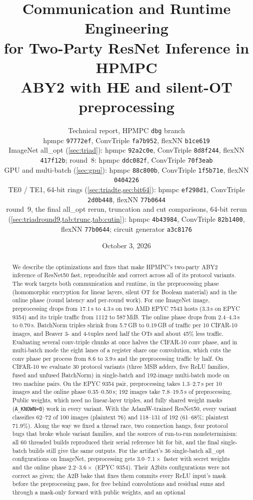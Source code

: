 \documentclass[10pt,a4paper]{article}
\title{Communication and Runtime Engineering\\for Two-Party ResNet Inference in HPMPC\\[4pt]
\large ABY2 with HE and silent-OT preprocessing}
\author{Technical report, HPMPC \texttt{dbg} branch\\[2pt]
\small hpmpc \texttt{97772ef}, ConvTriple \texttt{fa7b952}, flexNN \texttt{b1ce619}\\
ImageNet all\_opt (\cref{sec:triad}): hpmpc \texttt{92a2c0e}, ConvTriple \texttt{8d8f244}, flexNN \texttt{417f12b};
round~8: hpmpc \texttt{ddc082f}, ConvTriple \texttt{70f3eab}\\
GPU and multi-batch (\cref{sec:gpu}): hpmpc \texttt{88c800b}, ConvTriple \texttt{1f5b71e}, flexNN \texttt{0404226}\\
TE0 / TE1, 64-bit rings (\cref{sec:triadte,sec:bit64}): hpmpc \texttt{ef298d1}, ConvTriple \texttt{2d0b448}, flexNN
\texttt{77b0644}\\
round~9, the final all\_opt rerun, truncation and cut comparisons, 64-bit rerun (\cref{sec:triadround9,tab:trunc,tab:cutin}):
hpmpc \texttt{4b43984}, ConvTriple \texttt{82b1400}, flexNN \texttt{77b0644}; circuit generator \texttt{a3c8176}}
\date{October 3, 2026}
\newcommand{\flag}[1]{\nolinkurl{#1}}
\newcommand{\s}{\,s\xspace}
\begin{document}
\maketitle

\begin{abstract}
We describe the optimizations and fixes that make HPMPC's two-party ABY2 inference of ResNet50 fast,
reproducible and correct across all of its protocol variants. The work targets both communication and
runtime, in the preprocessing phase (homomorphic encryption for linear layers, silent OT for Boolean
material) and in the online phase (round latency and per-round work). For one ImageNet image,
preprocessing drops from 17.1\s to 4.3\s on two AMD EPYC 7543 hosts (3.3\s on EPYC 9354) and
its triple traffic from 1112 to 587\,MiB. The online phase drops from 2.4--4.3\s to 0.70\s.
BatchNorm triples shrink from 5.7\,GB to 0.19\,GB of traffic per
10 CIFAR-10 images, and Beaver 3- and 4-tuples need half the OTs and about 45\% less traffic.
Evaluating several conv-triple chunks at once halves the CIFAR-10 conv phase, and in multi-batch mode the eight
lanes of a register share one convolution, which cuts the conv phase per process from 8.6 to 3.9\s and the
preprocessing traffic by half.
On CIFAR-10 we evaluate 30 protocol variants (three MSB adders, five ReLU families, fused and unfused
BatchNorm) in single-batch and 192-image multi-batch mode on two machine pairs. On the EPYC 9354 pair, preprocessing
takes 1.3--2.7\s per 10 images and the online phase 0.35--0.50\s; 192 images take 7.8--19.5\s of preprocessing.
Public weights, which need no linear-layer triples, and fully shared weight masks (\flag{A_KNOWN=0}) work in every variant.
With the AdamW-trained ResNet50, every variant classifies 62--72 of 100 images (plaintext 76) and
118--131 of 192 (61--68\%; plaintext 71.9\%). Along the way we fixed a thread race, two connection hangs, four protocol
bugs that broke whole variant families, and the sources of run-to-run nondeterminism: all 60 threaded builds
reproduced their serial reference bit for bit, and the final single-batch builds still give the same outputs.
For the artifact's 36 single-batch all\_opt configurations on ImageNet, preprocessing gets $3.0$--$7.1\times$
faster with secret weights and the online phase $2.2$--$3.6\times$ (EPYC 9354). Their A2bits configurations
were not correct as given; the A2B bake that fixes them commits every ReLU input's mask before the preprocessing pass,
for free behind convolutions and residual sums and through a mask-only forward with public weights, and an optional

\end{abstract}
\end{document}
